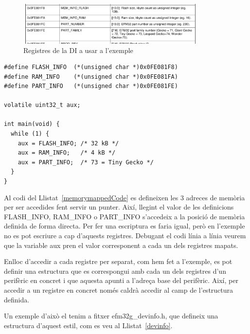 \begin{figure}
 \centering
 \includegraphics[width=0.85\textwidth, keepaspectratio]{imatges/DI_Table_RM.png}
 \caption{Registres de la DI a usar a l'exemple \cite[24]{EFM32GRM}}
 \label{fig:EFM32_DI}
\end{figure}



\begin{lstlisting}[frame=single,caption={Accedint a memòria en C},label=memorymappedCode,style=customc]
#define FLASH_INFO  (*(unsigned char *)0x0FE081F8)
#define RAM_INFO    (*(unsigned char *)0x0FE081FA)
#define PART_INFO   (*(unsigned char *)0x0FE081FE)

volatile uint32_t aux;

int main(void) {
  while (1) {
    aux = FLASH_INFO; /* 32 kB */
    aux = RAM_INFO;   /* 4 kB */
    aux = PART_INFO;  /* 73 = Tiny Gecko */
  }
}
\end{lstlisting}

Al codi del Llistat~\ref{memorymappedCode} es defineixen les 3 adreces de memòria per ser accedides fent servir un punter. Així, llegint el valor de les definicions FLASH\_INFO, RAM\_INFO o PART\_INFO s'accedeix a la posició de memòria definida de forma directa. Per fer una escriptura es faria igual, però en l'exemple no es pot escriure a cap d'aquests registres. Debugant el codi línia a línia veurem que la variable aux pren el valor corresponent a cada un dels registres mapats.

Enlloc d'accedir a cada registre per separat, com hem fet a l'exemple, es pot definir una estructura que es correspongui amb cada un dels registres d'un perifèric en concret i que aquesta apunti a l'adreça base del perifèric. Així, per accedir a un registre en concret només caldrà accedir al camp de l'estructura definida.

Un exemple d'això el tenim a fitxer efm32g\_devinfo.h, que defineix una estructura d'aquest estil, com es veu al Llistat~\ref {devinfo}.

